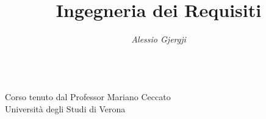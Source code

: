 \documentclass[oneside,a4paper,11pt]{book}
\title{Ingegneria dei Requisiti}
\author{\textit{Alessio Gjergji}}
\date{}
\theoremstyle{italicstyle}
\theoremstyle{normStyle}
\begin{document}
\begin{titlingpage}
  \centering
  \huge
  \textbf{\thetitle}\\[0.5cm]
  \normalsize
  Corso tenuto dal Professor Mariano Ceccato\\[0.5cm]
  Università degli Studi di Verona\\[1cm]
  \large
  \theauthor\\[0.5cm]
\end{titlingpage}
\tableofcontents






\end{document}

